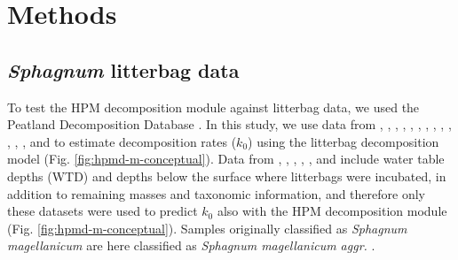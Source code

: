 \documentclass[esd, manuscript]{copernicus}
\begin{document}
\hypertarget{sdm-003-methods}{%
\section{Methods}\label{sdm-003-methods}}

\hypertarget{sdm-003-methods-1}{%
\subsection{\texorpdfstring{\emph{Sphagnum} litterbag data}{Sphagnum litterbag data}}\label{sdm-003-methods-1}}

To test the HPM decomposition module against litterbag data, we used the Peatland Decomposition Database \citep{Teickner.2024c}. In this study, we use data from \citet{Bartsch.1985}, \citet{Vitt.1990}, \citet{Johnson.1991}, \citet{Szumigalski.1996}, \citet{Prevost.1997}, \citet{Scheffer.2001}, \citet{Thormann.2001}, \citet{Asada.2005b}, \citet{Trinder.2008}, \citet{Breeuwer.2008}, \citet{Strakova.2010}, \citet{Hagemann.2015}, \citet{Golovatskaya.2017}, and \citet{Makila.2018} to estimate decomposition rates (\(k_0\)) using the litterbag decomposition model (Fig. \ref{fig:hpmd-m-conceptual}). Data from \citet{Johnson.1991}, \citet{Szumigalski.1996}, \citet{Prevost.1997}, \citet{Strakova.2010}, \citet{Golovatskaya.2017}, and \citet{Makila.2018} include water table depths (WTD) and depths below the surface where litterbags were incubated, in addition to remaining masses and taxonomic information, and therefore only these datasets were used to predict \(k_0\) also with the HPM decomposition module (Fig. \ref{fig:hpmd-m-conceptual}). Samples originally classified as \emph{Sphagnum magellanicum} are here classified as \emph{Sphagnum magellanicum aggr.} \citep{Hassel.2018}.
\end{document}
